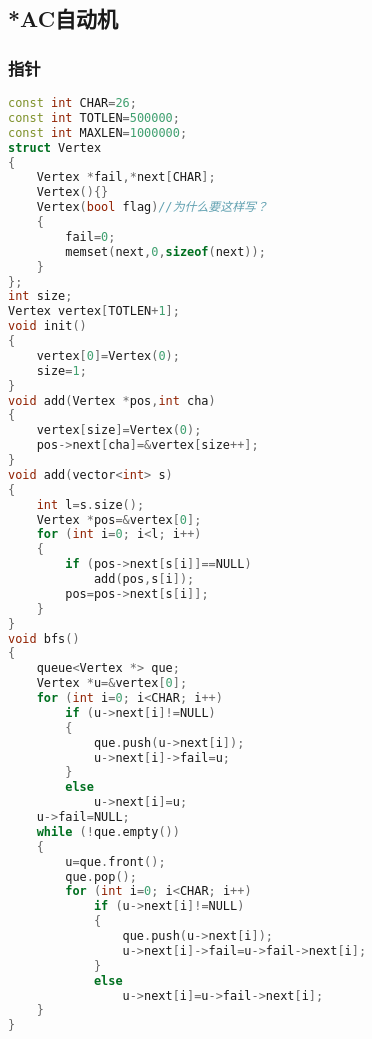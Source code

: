 \subsection{*AC自动机}
    \subsubsection{指针}
        \begin{lstlisting}[language=c++]
const int CHAR=26;
const int TOTLEN=500000;
const int MAXLEN=1000000;
struct Vertex
{
    Vertex *fail,*next[CHAR];
    Vertex(){}
    Vertex(bool flag)//为什么要这样写？
    {
        fail=0;
        memset(next,0,sizeof(next));
    }
};
int size;
Vertex vertex[TOTLEN+1];
void init()
{
    vertex[0]=Vertex(0);
    size=1;
}
void add(Vertex *pos,int cha)
{
    vertex[size]=Vertex(0);
    pos->next[cha]=&vertex[size++];
}
void add(vector<int> s)
{
    int l=s.size();
    Vertex *pos=&vertex[0];
    for (int i=0; i<l; i++)
    {
        if (pos->next[s[i]]==NULL)
            add(pos,s[i]);
        pos=pos->next[s[i]];
    }
}
void bfs()
{
    queue<Vertex *> que;
    Vertex *u=&vertex[0];
    for (int i=0; i<CHAR; i++)
        if (u->next[i]!=NULL)
        {
            que.push(u->next[i]);
            u->next[i]->fail=u;
        }
        else
            u->next[i]=u;
    u->fail=NULL;
    while (!que.empty())
    {
        u=que.front();
        que.pop();
        for (int i=0; i<CHAR; i++)
            if (u->next[i]!=NULL)
            {
                que.push(u->next[i]);
                u->next[i]->fail=u->fail->next[i];
            }
            else
                u->next[i]=u->fail->next[i];
    }
}
        \end{lstlisting}
